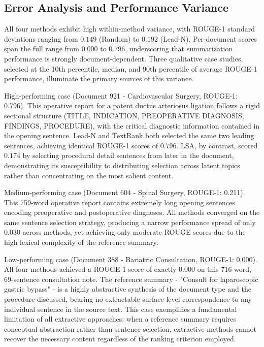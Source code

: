 \documentclass[12pt,twoside,en,win]{bmzhart}
\begin{document}
	\subsection{Error Analysis and Performance Variance}

	All four methods exhibit high within-method variance, with ROUGE-1 standard deviations ranging from $0.149$ (Random) 
	to $0.192$ (Lead-N). Per-document scores span the full range from $0.000$ to $0.796$, underscoring that summarization 
	performance is strongly document-dependent. Three qualitative case studies, selected at the 10th percentile, median, 
	and 90th percentile of average ROUGE-1 performance, illuminate the primary sources of this variance.

	High-performing case (Document 921 - Cardiovascular Surgery, ROUGE-1: 0.796). This operative report for a patent ductus 
	arteriosus ligation follows a rigid sectional structure (TITLE, INDICATION, PREOPERATIVE DIAGNOSIS, FINDINGS, PROCEDURE), 
	with the critical diagnostic information contained in the opening sentence. Lead-N and TextRank both selected the same 
	two leading sentences, achieving identical ROUGE-1 scores of $0.796$. LSA, by contrast, scored $0.174$ by selecting 
	procedural detail sentences from later in the document, demonstrating its susceptibility to distributing selection 
	across latent topics rather than concentrating on the most salient content.

	Medium-performing case (Document 604 - Spinal Surgery, ROUGE-1: 0.211). This 759-word operative report contains 
	extremely long opening sentences encoding preoperative and postoperative diagnoses. All methods converged on the 
	same sentence selection strategy, producing a narrow performance spread of only $0.030$ across methods, yet 
	achieving only moderate ROUGE scores due to the high lexical complexity of the reference summary.

	Low-performing case (Document 388 - Bariatric Consultation, ROUGE-1: 0.000). All four methods achieved a ROUGE-1 score 
	of exactly $0.000$ on this 716-word, 69-sentence consultation note. The reference summary - "Consult for laparoscopic 
	gastric bypass" - is a highly abstractive synthesis of the document type and the procedure discussed, bearing no 
	extractable surface-level correspondence to any individual sentence in the source text. This case exemplifies a 
	fundamental limitation of all extractive approaches: when a reference summary requires conceptual abstraction rather 
	than sentence selection, extractive methods cannot recover the necessary content regardless of the ranking criterion
	employed.
\end{document}
